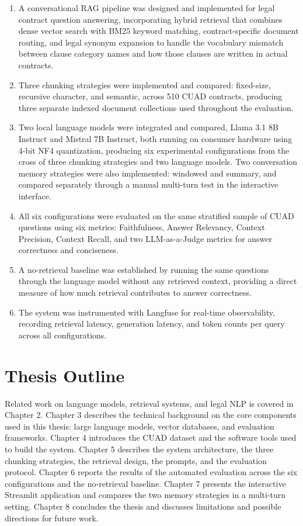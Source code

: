 \begin{enumerate}
    \item A conversational RAG pipeline was designed and implemented for legal contract question answering, incorporating hybrid retrieval that combines dense vector search with BM25 keyword matching, contract-specific document routing, and legal synonym expansion to handle the vocabulary mismatch between clause category names and how those clauses are written in actual contracts.
    \item Three chunking strategies were implemented and compared: fixed-size, recursive character, and semantic, across 510 CUAD contracts, producing three separate indexed document collections used throughout the evaluation.
    \item Two local language models were integrated and compared, Llama 3.1 8B Instruct and Mistral 7B Instruct, both running on consumer hardware using 4-bit NF4 quantization, producing six experimental configurations from the cross of three chunking strategies and two language models. Two conversation memory strategies were also implemented: windowed and summary, and compared separately through a manual multi-turn test in the interactive interface.
    \item All six configurations were evaluated on the same stratified sample of CUAD questions using six metrics: Faithfulness, Answer Relevancy, Context Precision, Context Recall, and two LLM-as-a-Judge metrics for answer correctness and conciseness.
    \item A no-retrieval baseline was established by running the same questions through the language model without any retrieved context, providing a direct measure of how much retrieval contributes to answer correctness.
    \item The system was instrumented with Langfuse for real-time observability, recording retrieval latency, generation latency, and token counts per query across all configurations.
\end{enumerate}

\section{Thesis Outline}

Related work on language models, retrieval systems, and legal NLP is covered in Chapter 2. Chapter 3 describes the technical background on the core components used in this thesis: large language models, vector databases, and evaluation frameworks. Chapter 4 introduces the CUAD dataset and the software tools used to build the system. Chapter 5 describes the system architecture, the three chunking strategies, the retrieval design, the prompts, and the evaluation protocol. Chapter 6 reports the results of the automated evaluation across the six configurations and the no-retrieval baseline. Chapter 7 presents the interactive Streamlit application and compares the two memory strategies in a multi-turn setting. Chapter 8 concludes the thesis and discusses limitations and possible directions for future work.

